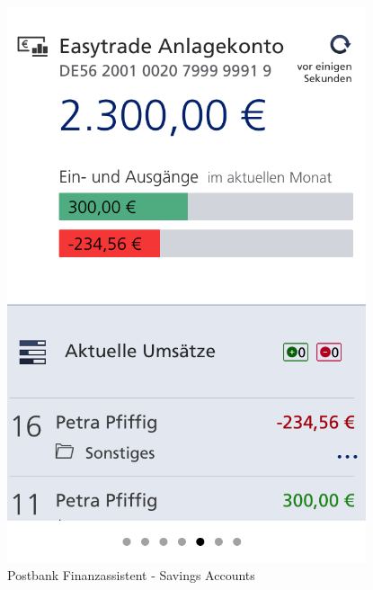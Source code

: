 \begin{figure}[H]
\begin{minipage}[b]{.5\linewidth}
        \centering\includegraphics[width=0.94\textwidth]{img/screenshots/ex3p6.png}
    \end{minipage}
	\captionsetup{labelformat=empty}
    \caption[]{Postbank Finanzassistent - Savings Accounts}
\end{figure}
